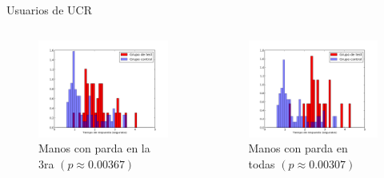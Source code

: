 \documentclass{beamer}
\begin{document}
\begin{frame}{Usuarios de UCR}
    \begin{columns}[c] %
    	\begin{figure}
        \includegraphics[width=1\linewidth]{graficos/5vs3ucr.png}
    	\caption{Manos con parda en la 3ra $(p \approx 0.00367)$}
        \end{figure}
    	\begin{figure}
        \includegraphics[width=1\linewidth]{graficos/6vs3ucr.png}
    	\caption{Manos con parda en todas $(p \approx 0.00307)$}
    	\end{figure}   
    \end{columns}
\end{frame}
\end{document}
